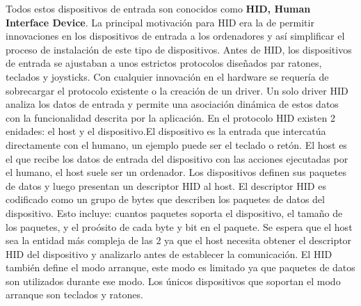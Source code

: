 Todos estos dispositivos de entrada son conocidos como \textbf{HID, Human Interface Device}. La principal motivaci\'on para HID era la de permitir innovaciones en los dispositivos de entrada a los ordenadores y as\'i simplificar el proceso de instalaci\'on de este tipo de dispositivos. Antes de HID, los dispositivos de entrada se ajustaban a unos estrictos protocolos dise\~nados par ratones, teclados y joysticks. Con cualquier innovaci\'on en el hardware se requer\'ia de sobrecargar el protocolo existente o la creaci\'on de un driver. Un solo driver HID analiza los datos de entrada y permite una asociaci\'on din\'amica de estos datos con la funcionalidad descrita por la aplicaci\'on. En el protocolo HID existen 2 enidades: el host y el dispositivo.El dispositivo es la entrada que intercat\'ua directamente con el humano, un ejemplo puede ser el teclado o ret\'on. El host es el que recibe los datos de entrada del dispositivo con las acciones ejecutadas por el humano, el host suele ser un ordenador.
 Los dispositivos definen sus paquetes de datos y luego presentan un descriptor HID al host. El descriptor HID es codificado como un grupo de bytes que describen los paquetes de datos del dispositivo. Esto incluye: cuantos paquetes soporta el dispositivo, el tama\~no de los paquetes, y el pro\'osito de cada byte y bit en el paquete. Se espera que el host sea la entidad m\'as compleja de las 2 ya que el host necesita obtener el descriptor HID del dispositivo y analizarlo antes de establecer la comunicaci\'on. El HID tambi\'en define el modo arranque, este modo es limitado ya que paquetes de datos son utilizados durante ese modo. Los \'unicos dispositivos que soportan el modo arranque son teclados y ratones.\par

